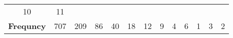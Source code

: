 \documentclass[]{book}
\theoremstyle{definition}
\theoremstyle{definition}
\theoremstyle{definition}
\theoremstyle{remark}
\begin{document}
\begin{longtable}[]{@{}ccccccccccccc@{}}
\begin{minipage}[t]{0.04\columnwidth}
10\strut
\end{minipage} & \begin{minipage}[t]{0.04\columnwidth}\centering\strut
11\strut
\end{minipage}\tabularnewline
\begin{minipage}[t]{0.19\columnwidth}\centering\strut
\textbf{Frequncy}\strut
\end{minipage} & \begin{minipage}[t]{0.05\columnwidth}\centering\strut
707\strut
\end{minipage} & \begin{minipage}[t]{0.05\columnwidth}\centering\strut
209\strut
\end{minipage} & \begin{minipage}[t]{0.04\columnwidth}\centering\strut
86\strut
\end{minipage} & \begin{minipage}[t]{0.04\columnwidth}\centering\strut
40\strut
\end{minipage} & \begin{minipage}[t]{0.04\columnwidth}\centering\strut
18\strut
\end{minipage} & \begin{minipage}[t]{0.04\columnwidth}\centering\strut
12\strut
\end{minipage} & \begin{minipage}[t]{0.03\columnwidth}\centering\strut
9\strut
\end{minipage} & \begin{minipage}[t]{0.03\columnwidth}\centering\strut
4\strut
\end{minipage} & \begin{minipage}[t]{0.03\columnwidth}\centering\strut
6\strut
\end{minipage} & \begin{minipage}[t]{0.03\columnwidth}\centering\strut
1\strut
\end{minipage} & \begin{minipage}[t]{0.04\columnwidth}\centering\strut
3\strut
\end{minipage} & \begin{minipage}[t]{0.04\columnwidth}\centering\strut
2\strut
\end{minipage}\tabularnewline
\bottomrule
\end{longtable}
\end{document}
